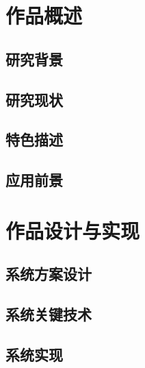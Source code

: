 \documentclass{cumcmthesis}
\begin{document}
 \maketitle
 
 \newpage
 \thispagestyle{empty}
 \tableofcontents
 \newpage
 
\begin{cnabstract}

	
\end{cnabstract}

\begin{enabstract}


	
\end{enabstract}

\section{作品概述}
\subsection{研究背景}
\subsection{研究现状}
\subsection{特色描述}
\subsection{应用前景}


\section{作品设计与实现}
\subsection{系统方案设计}
\subsection{系统关键技术}
\subsection{系统实现}
\end{document}
